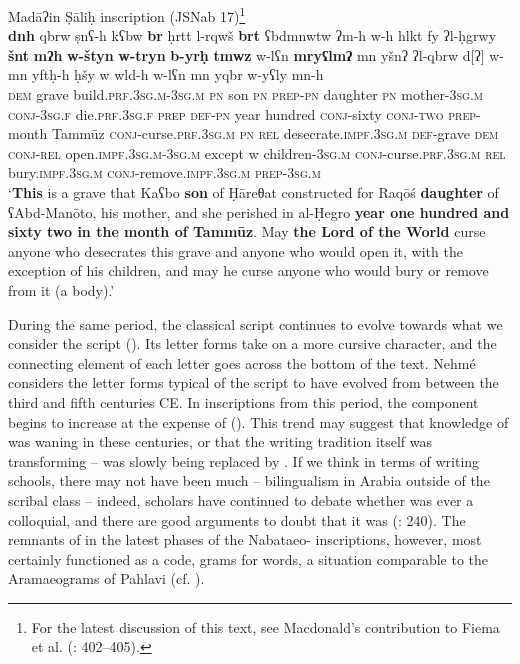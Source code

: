 \documentclass[output=paper]{langsci/langscibook}
\begin{document}
\ea Madāʔin Ṣāliḥ inscription (JSNab 17)\footnote{For the latest discussion of this text, see Macdonald’s contribution to Fiema et al. (\citeyear{Fiemaetal2015}: 402--405).}\label{Raqosh}\\ 
\gll   \textbf{dnh} qbrw ṣnʕ-h kʕbw \textbf{br} ḥrtt l-rqwš \textbf{brt} ʕbdmnwtw ʔm-h w-h hlkt fy ʔl-ḥgrwy \textbf{šnt} \textbf{mʔh} \textbf{w-štyn} \textbf{w-tryn} \textbf{b-yrḥ} \textbf{tmwz} w-lʕn \textbf{mryʕlmʔ} mn yšnʔ ʔl-qbrw d[ʔ] 	w-mn 		yftḥ-h ḥšy w wld-h w-lʕn mn yqbr w-{y}ʕly mn-h \\
       \textsc{dem} grave build.\textsc{prf.3sg.m-3sg.m} \textsc{pn} son \textsc{pn} \textsc{prep-pn} daughter \textsc{pn} mother-\textsc{3sg.m} \textsc{conj-3sg.f} die.\textsc{prf.3sg.f} \textsc{prep} \textsc{def-pn} year hundred \textsc{conj}-sixty \textsc{conj-two} \textsc{prep}-month Tammūz \textsc{conj}-curse.\textsc{prf.3sg.m} \textsc{pn} \textsc{rel} desecrate.\textsc{impf.3sg.m} \textsc{def}-grave \textsc{dem} \textsc{conj-rel} open.\textsc{impf.3sg.m-3sg.m} except w children-\textsc{3sg.m} \textsc{conj}-curse.\textsc{prf.3sg.m} \textsc{rel} bury.\textsc{impf.3sg.m} \textsc{conj}-remove.\textsc{impf.3sg.m} \textsc{prep-3sg.m} \\
\glt   `\textbf{This} is a grave that Kaʕbo \textbf{son} of Ḥāreθat constructed for Raqōś \textbf{daughter} of ʕAbd-Manōto, his mother, and she perished in al-Ḥegro \textbf{year one hundred and sixty two in the month of Tammūz}. May \textbf{the Lord of the World}  curse anyone who desecrates this grave and anyone who would open it, with the exception of his children, and may he curse anyone who would bury or remove from it (a body).'\\
\z

During the same period, the classical  script continues to evolve towards what we consider the  script (\citealt{Nehmé2010}). Its letter forms take on a more cursive character, and the connecting element of each letter goes across the bottom of the text. Nehmé considers the letter forms typical of the  script to have evolved from  between the third and fifth centuries CE. In inscriptions from this period, the  component begins to increase at the expense of  (\citealt{Nehmé2017}). This trend may suggest that knowledge of  was waning in these centuries, or that the writing tradition itself was transforming –  was slowly being replaced by . If we think in terms of writing schools, there may not have been much -- {bilingualism} in Arabia outside of the scribal class – indeed, scholars have continued to debate whether  was ever a colloquial, and there are good arguments to doubt that it was (\citealt{Gzella2015}: 240). The remnants of  in the latest phases of the Nabataeo- inscriptions, however, most certainly functioned as a code, grams for  words, a situation comparable to the Aramaeograms of Pahlavi (cf. \citealt{Nyberg1974}).
\end{document}

